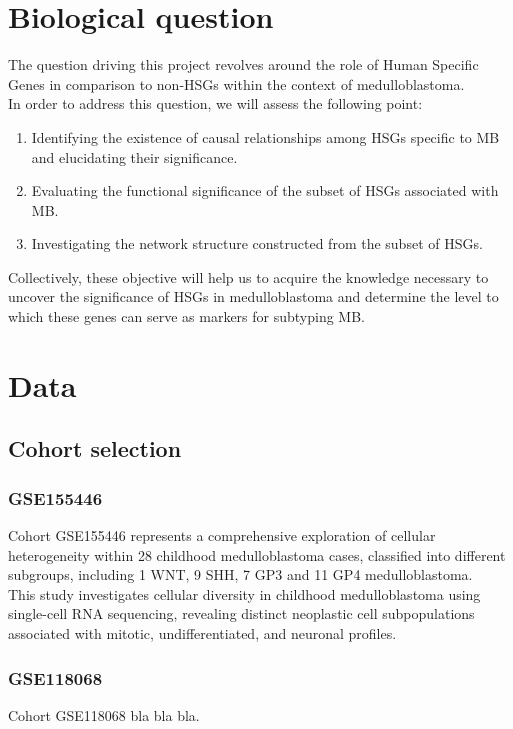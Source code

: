 \documentclass[10pt]{SelfArx} %
\begin{document}
\section{Biological question}\label{sec:biological_question}
The question driving this project revolves around the role of Human Specific Genes in comparison to non-HSGs within the context of medulloblastoma. \\
In order to address this question, we will assess the following point: 
\begin{enumerate}
    \item Identifying the existence of causal relationships among HSGs specific to MB and elucidating their significance. 
    \item Evaluating the functional significance of the subset of HSGs associated with MB.
    \item Investigating the network structure constructed from the subset of HSGs. 
\end{enumerate}
Collectively, these objective will help us to acquire the knowledge necessary to uncover the significance of HSGs in medulloblastoma and determine the level to which these genes can serve as markers for subtyping MB.

\section{Data}\label{sec:data}

\subsection{Cohort selection}\label{sec:cohort_selection}

\subsubsection{GSE155446}\label{sec:GSE155446}
Cohort GSE155446 \cite{riemondy2022neoplastic} represents a comprehensive exploration of cellular heterogeneity within 28 childhood medulloblastoma cases, classified into different subgroups, including 1 WNT, 9 SHH, 7 GP3 and 11 GP4 medulloblastoma. \\
This study investigates cellular diversity in childhood medulloblastoma using single-cell RNA sequencing, revealing distinct neoplastic cell subpopulations associated with mitotic, undifferentiated, and neuronal profiles. 

\subsubsection{GSE118068}\label{sec:GSE118068}
Cohort GSE118068 \cite{vladoiu2019childhood} bla bla bla.
\end{document}
